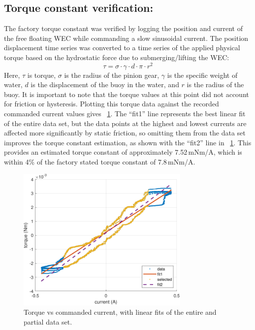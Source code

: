 \documentclass[hardware,article,submit,pdftex,moreauthors]{Definitions/mdpi}
\begin{document}
\subsection{Torque constant verification:}\label{tConstSec}
The factory torque constant was verified by logging the position and current of the free floating WEC while commanding a slow sinusoidal current.
The position displacement time series was converted to a time series of the applied physical torque based on the hydrostatic force due to submerging/lifting the WEC:
%
\begin{equation}
  \tau = \sigma \cdot \gamma \cdot d \cdot \pi \cdot r^2
\end{equation}
%
Here, $\tau$ is torque, $\sigma$ is the radius of the pinion gear, $\gamma$ is the specific weight of water, $d$ is the displacement of the buoy in the water, and $r$ is the radius of the buoy.
It is important to note that the torque values at this point did not account for friction or hysteresis.
Plotting this torque data against the recorded commanded current values gives  \figurename~\ref{fig:TorqueConstant}.
The ``fit1'' line represents the best linear fit of the entire data set, but the data points at the highest and lowest currents are affected more significantly by static friction, so omitting them from the data set improves the torque constant estimation, as shown with the ``fit2'' line in \figurename~\ref{fig:TorqueConstant}.
This provides an estimated torque constant of approximately 7.52\,mNm/A, which is within 4\% of the factory stated torque constant of 7.8\,mNm/A.

\begin{figure}[tb]
  \centering
  \includegraphics[width=0.75\textwidth]{diagrams/TorqueConstant.pdf}
  \caption{Torque vs commanded current, with linear fits of the entire and partial data set.}
  \label{fig:TorqueConstant}
\end{figure}
\end{document}
